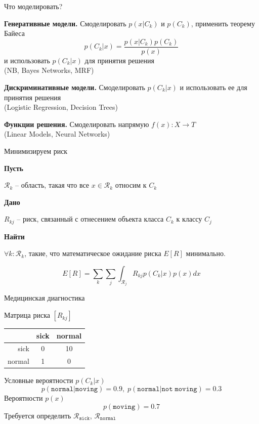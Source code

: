 \documentclass[10pt,a4paper]{beamer}
\begin{document}

\begin{frame}{Что моделировать?}

{\bf Генеративные модели.} Смоделировать $p(x | C_k)$ и $p(C_k)$, применить теорему Байеса
\[
p(C_k | x) = \frac{p(x | C_k) p(C_k)}{p(x)}
\]
и использовать $p(C_k | x)$ для принятия решения \\ (NB, Bayes Networks, MRF)
\vspace{1em}

{\bf Дискриминативные модели.} Смоделировать $p(C_k | x)$ и использовать ее для принятия решения \\ (Logistic Regression, Decision Trees)
\vspace{1em}

{\bf Функции решения.} Смоделировать напрямую $f(x): X \rightarrow T$ \\ (Linear Models, Neural Networks)

\end{frame}


\begin{frame}{Минимизируем риск}

{\bf Пусть}

$\mathcal{R}_k$ -- область, такая что все $x \in \mathcal{R}_k$ относим к $C_k$

{\bf Дано}

$R_{kj}$ -- риск, связанный с отнесением объекта класса $C_k$ к классу $C_j$

{\bf Найти}

$\forall k: \mathcal{R}_k$, такие, что математическое ожидание риска $E[R]$ минимально.

\[
E[R] = \sum_k \sum_j \int_{\mathcal{R}_j} R_{kj} p(C_k | x) p(x) dx
\]

\end{frame}


\begin{frame}{Медицинская диагностика}

Матрица риска $[R_{kj}]$

\begin{center}
\begin{tabular}{r | c c}
 & sick & normal \\
\hline
sick & 0 & 10 \\
normal & 1 & 0 
\end{tabular}
\end{center}

Условные вероятности $p(C_k | x)$
\[ 
p(\mathtt{normal} | \mathtt{moving}) = 0.9, \; p(\mathtt{normal} | {\mathtt{not\;moving}}) = 0.3
\]
Вероятности $p(x)$
\[
p(\mathtt{moving}) = 0.7
\]
Требуется определить $\mathcal{R}_{\mathtt{sick}}$, $\mathcal{R}_{\mathtt{normal}}$

\end{frame}
\end{document}
